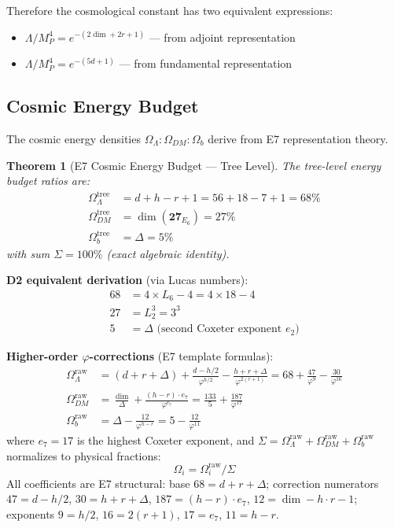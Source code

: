 \documentclass[11pt,a4paper]{article}
\newtheorem{theorem}{Theorem}
\begin{document}
Therefore the cosmological constant has two equivalent expressions:
\begin{itemize}
\item $\Lambda/M_P^4 = e^{-(2\dim + 2r + 1)}$ --- from adjoint representation
\item $\Lambda/M_P^4 = e^{-(5d + 1)}$ --- from fundamental representation
\end{itemize}

\subsection{Cosmic Energy Budget}

The cosmic energy densities $\Omega_\Lambda : \Omega_{DM} : \Omega_b$ derive from E7 representation theory.

\begin{theorem}[E7 Cosmic Energy Budget --- Tree Level]
The tree-level energy budget ratios are:
\begin{align}
\Omega^{\text{tree}}_\Lambda &= d + h - r + 1 = 56 + 18 - 7 + 1 = 68\% \\
\Omega^{\text{tree}}_{DM} &= \dim(\mathbf{27}_{E_6}) = 27\% \\
\Omega^{\text{tree}}_b &= \Delta = 5\%
\end{align}
with sum $\Sigma = 100\%$ (exact algebraic identity).
\end{theorem}

\textbf{D2 equivalent derivation} (via Lucas numbers):
\begin{align}
68 &= 4 \times L_6 - 4 = 4 \times 18 - 4 \\
27 &= L_2^3 = 3^3 \\
5 &= \Delta \text{ (second Coxeter exponent } e_2\text{)}
\end{align}

\textbf{Higher-order $\varphi$-corrections} (E7 template formulas):
\begin{align}
\Omega_\Lambda^{\text{raw}} &= (d + r + \Delta) + \frac{d - h/2}{\varphi^{h/2}} - \frac{h + r + \Delta}{\varphi^{2(r+1)}} = 68 + \frac{47}{\varphi^9} - \frac{30}{\varphi^{16}} \label{eq:omega_lambda_raw} \\
\Omega_{DM}^{\text{raw}} &= \frac{\dim}{\Delta} + \frac{(h - r) \cdot e_7}{\varphi^{e_7}} = \frac{133}{5} + \frac{187}{\varphi^{17}} \label{eq:omega_dm_raw} \\
\Omega_b^{\text{raw}} &= \Delta - \frac{12}{\varphi^{h-r}} = 5 - \frac{12}{\varphi^{11}} \label{eq:omega_b_raw}
\end{align}
where $e_7 = 17$ is the highest Coxeter exponent, and $\Sigma = \Omega_\Lambda^{\text{raw}} + \Omega_{DM}^{\text{raw}} + \Omega_b^{\text{raw}}$ normalizes to physical fractions:
\begin{equation}
\Omega_i = \Omega_i^{\text{raw}} / \Sigma
\end{equation}
All coefficients are E7 structural: base $68 = d + r + \Delta$; correction numerators $47 = d - h/2$, $30 = h + r + \Delta$, $187 = (h-r) \cdot e_7$, $12 = \dim - h \cdot r - 1$; exponents $9 = h/2$, $16 = 2(r+1)$, $17 = e_7$, $11 = h - r$.
\end{document}
